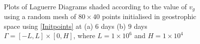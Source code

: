 \begin{figure}[h!]
	\centering
	\\
	\caption{Plots of Laguerre Diagrams shaded according to the value of $v_g$ using a random mesh of $80 \times 40$ points initialised in geostrophic space using \ref{Initpoints} at (a) $6$ days (b) $9$ days $\Gamma = [-L,L]\times[0,H]$, where $L = 1\times10^6$ and $H = 1\times10^4$}
	\label{vg2.5}
\end{figure}
